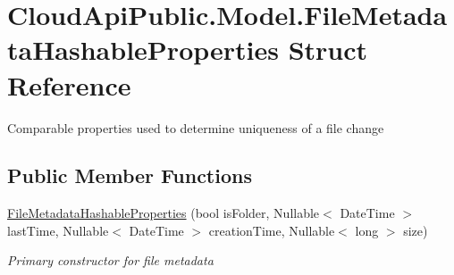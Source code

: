 \hypertarget{struct_cloud_api_public_1_1_model_1_1_file_metadata_hashable_properties}{\section{Cloud\-Api\-Public.\-Model.\-File\-Metadata\-Hashable\-Properties Struct Reference}
\label{struct_cloud_api_public_1_1_model_1_1_file_metadata_hashable_properties}
}


Comparable properties used to determine uniqueness of a file change  


\subsection*{Public Member Functions}
\begin{DoxyCompactItemize}
\item 
\hyperlink{struct_cloud_api_public_1_1_model_1_1_file_metadata_hashable_properties_a9b01f19ff3a326be0f1281bdfafb620d}{File\-Metadata\-Hashable\-Properties} (bool is\-Folder, Nullable$<$ Date\-Time $>$ last\-Time, Nullable$<$ Date\-Time $>$ creation\-Time, Nullable$<$ long $>$ size)
\begin{DoxyCompactList}\small\item\em Primary constructor for file metadata \end{DoxyCompactList}\end{DoxyCompactItemize}
